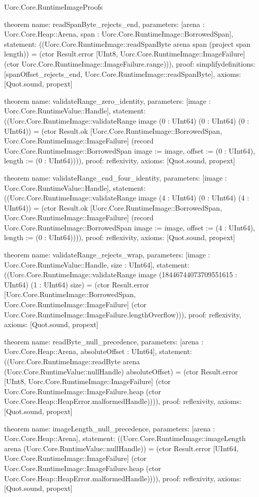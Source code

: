 \begin{lexlean}{Uorc.Core.RuntimeImageProofs}
\begin{semanticmodule}
theorem{
  name: readSpanByte_rejects_end,
  parameters: [arena : Uorc.Core.Heap::Arena, span : Uorc.Core.RuntimeImage::BorrowedSpan],
  statement: ((Uorc.Core.RuntimeImage::readSpanByte arena span (project span length)) = (ctor Result.error [UInt8, Uorc.Core.RuntimeImage::ImageFailure] (ctor Uorc.Core.RuntimeImage::ImageFailure.range))),
  proof: simplify{definitions: [spanOffset_rejects_end, Uorc.Core.RuntimeImage::readSpanByte]},
  axioms: [Quot.sound, propext]
}

theorem{
  name: validateRange_zero_identity,
  parameters: [image : Uorc.Core.RuntimeValue::Handle],
  statement: ((Uorc.Core.RuntimeImage::validateRange image (0 : UInt64) (0 : UInt64) (0 : UInt64)) = (ctor Result.ok [Uorc.Core.RuntimeImage::BorrowedSpan, Uorc.Core.RuntimeImage::ImageFailure] (record Uorc.Core.RuntimeImage::BorrowedSpan {image := image, offset := (0 : UInt64), length := (0 : UInt64)}))),
  proof: reflexivity{},
  axioms: [Quot.sound, propext]
}

theorem{
  name: validateRange_end_four_identity,
  parameters: [image : Uorc.Core.RuntimeValue::Handle],
  statement: ((Uorc.Core.RuntimeImage::validateRange image (4 : UInt64) (0 : UInt64) (4 : UInt64)) = (ctor Result.ok [Uorc.Core.RuntimeImage::BorrowedSpan, Uorc.Core.RuntimeImage::ImageFailure] (record Uorc.Core.RuntimeImage::BorrowedSpan {image := image, offset := (4 : UInt64), length := (0 : UInt64)}))),
  proof: reflexivity{},
  axioms: [Quot.sound, propext]
}

theorem{
  name: validateRange_rejects_wrap,
  parameters: [image : Uorc.Core.RuntimeValue::Handle, size : UInt64],
  statement: ((Uorc.Core.RuntimeImage::validateRange image (18446744073709551615 : UInt64) (1 : UInt64) size) = (ctor Result.error [Uorc.Core.RuntimeImage::BorrowedSpan, Uorc.Core.RuntimeImage::ImageFailure] (ctor Uorc.Core.RuntimeImage::ImageFailure.lengthOverflow))),
  proof: reflexivity{},
  axioms: [Quot.sound, propext]
}

theorem{
  name: readByte_null_precedence,
  parameters: [arena : Uorc.Core.Heap::Arena, absoluteOffset : UInt64],
  statement: ((Uorc.Core.RuntimeImage::readByte arena (Uorc.Core.RuntimeValue::nullHandle) absoluteOffset) = (ctor Result.error [UInt8, Uorc.Core.RuntimeImage::ImageFailure] (ctor Uorc.Core.RuntimeImage::ImageFailure.heap (ctor Uorc.Core.Heap::HeapError.malformedHandle)))),
  proof: reflexivity{},
  axioms: [Quot.sound, propext]
}

theorem{
  name: imageLength_null_precedence,
  parameters: [arena : Uorc.Core.Heap::Arena],
  statement: ((Uorc.Core.RuntimeImage::imageLength arena (Uorc.Core.RuntimeValue::nullHandle)) = (ctor Result.error [UInt64, Uorc.Core.RuntimeImage::ImageFailure] (ctor Uorc.Core.RuntimeImage::ImageFailure.heap (ctor Uorc.Core.Heap::HeapError.malformedHandle)))),
  proof: reflexivity{},
  axioms: [Quot.sound, propext]
}


\end{semanticmodule}
\end{lexlean}
